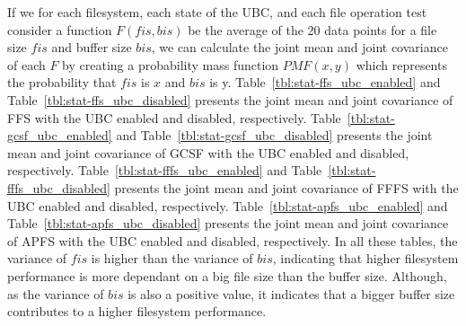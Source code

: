 If we for each filesystem, each state of the \gls{UBC}, and each file operation test consider a function $F(fis, bis)$ be the average of the 20 data points for a file size $fis$ and buffer size $bis$, we can calculate the joint mean and joint covariance of each $F$ by creating a probability mass function $PMF(x, y)$ which represents the probability that $fis$ is $x$ and $bis$ is y. Table~\ref{tbl:stat-ffs_ubc_enabled} and Table~\ref{tbl:stat-ffs_ubc_disabled} presents the joint mean and joint covariance of \gls{FFS} with the \gls{UBC} enabled and disabled, respectively. Table~\ref{tbl:stat-gcsf_ubc_enabled} and Table~\ref{tbl:stat-gcsf_ubc_disabled} presents the joint mean and joint covariance of \gls{GCSF} with the \gls{UBC} enabled and disabled, respectively. Table~\ref{tbl:stat-fffs_ubc_enabled} and Table~\ref{tbl:stat-fffs_ubc_disabled} presents the joint mean and joint covariance of \gls{FFFS} with the \gls{UBC} enabled and disabled, respectively. Table~\ref{tbl:stat-apfs_ubc_enabled} and Table~\ref{tbl:stat-apfs_ubc_disabled} presents the joint mean and joint covariance of \gls{APFS} with the \gls{UBC} enabled and disabled, respectively. In all these tables, the variance of $fis$ is higher than the variance of $bis$, indicating that higher filesystem performance is more dependant on a big file size than the buffer size. Although, as the variance of $bis$ is also a positive value, it indicates that a bigger buffer size contributes to a higher filesystem performance.


\FloatBarrier

\FloatBarrier



\FloatBarrier

\FloatBarrier



\FloatBarrier

\FloatBarrier



\FloatBarrier

\FloatBarrier